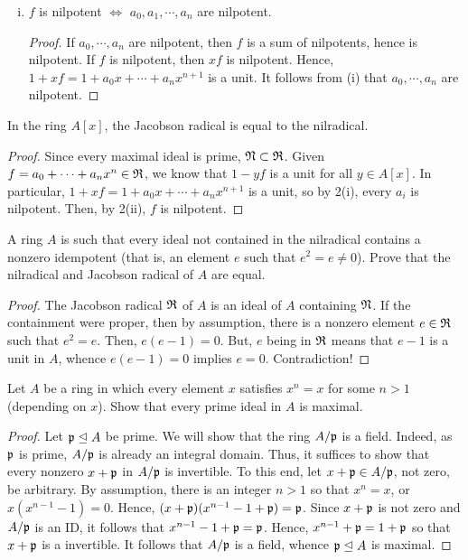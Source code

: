 \begin{enumerate}[i)]
        \item $f$ is nilpotent $\Leftrightarrow$ $a_0, a_1, \cdots, a_n$ are nilpotent.
            \begin{proof}
                If $a_0, \cdots, a_n$ are nilpotent, then $f$ is a sum of nilpotents, hence is nilpotent.
                If $f$ is nilpotent, then $xf$ is nilpotent. Hence, $1 + xf = 1 + a_0x + \cdots + a_nx^{n+1}$ is a unit.
                It follows from (i) that $a_0, \cdots, a_n$ are nilpotent.
            \end{proof}
\end{enumerate}

\setcounter{problem}{3}
\problem In the ring $A[x]$, the Jacobson radical is equal to the nilradical.
\begin{proof}
    Since every maximal ideal is prime, $\nilradical \subset \jacobsonradical$.
    Given $f = a_0 + \cdots + a_nx^n \in \jacobsonradical$, we know that $1-yf$ is a unit for all $y \in A[x]$.
    In particular, $1 + xf = 1 + a_0x + \cdots + a_{n}x^{n+1}$ is a unit, so by 2(i), every $a_i$ is nilpotent.
    Then, by 2(ii), $f$ is nilpotent.
\end{proof}

\setcounter{problem}{5}

\problem A ring $A$ is such that every ideal not contained in the nilradical contains a nonzero idempotent (that is, an element $e$ such that $e^2 = e \not= 0$). Prove that the nilradical and Jacobson radical of $A$ are equal.
\begin{proof}
    The Jacobson radical $\jacobsonradical$ of $A$ is an ideal of $A$ containing $\nilradical$.
    If the containment were proper, then by assumption, there is a nonzero element $e \in \jacobsonradical$ such that $e^2 = e$.
    Then, $e(e-1) = 0$. But, $e$ being in $\jacobsonradical$ means that $e-1$ is a unit in $A$, whence $e(e-1) = 0$ implies $e = 0$.
    Contradiction!
\end{proof}

\problem Let $A$ be a ring in which every element $x$ satisfies $x^n = x$ for some $n > 1$ (depending on $x$).
Show that every prime ideal in $A$ is maximal.

\begin{proof}
    Let $\frak{p} \ideal A$ be prime.
    We will show that the ring $A/\frak{p}$ is a field.
    Indeed, as $\frak{p}$ is prime, $A/\frak{p}$ is already an integral domain.
    Thus, it suffices to show that every nonzero $x + \frak{p}$ in $A/\frak{p}$ is invertible.
    To this end, let $x + \frak{p} \in A/\frak{p}$, not zero, be arbitrary.
    By assumption, there is an integer $n > 1$ so that $x^n = x$, or $x(x^{n-1} - 1) = 0$.
    Hence, $(x + \frak{p})(x^{n-1} -1  + \frak{p}) = \frak{p}$.
    Since $x + \frak{p}$ is not zero and $A/\frak{p}$ is an ID, it follows that $x^{n-1} - 1 + \frak{p} = \frak{p}$.
    Hence, $x^{n-1} + \frak{p} = 1 + \frak{p}$ so that $x + \frak{p}$ is a invertible.
    It follows that $A/\frak{p}$ is a field, whence $\frak{p} \ideal A$ is maximal.
\end{proof}


